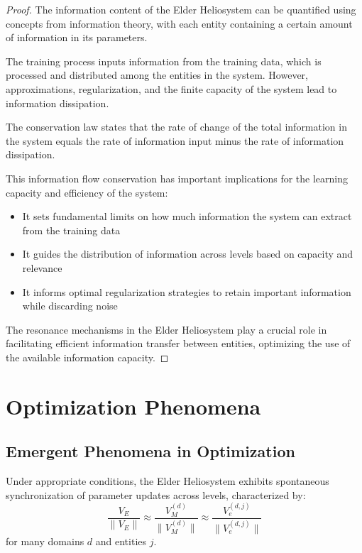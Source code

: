 \begin{proof}
The information content of the Elder Heliosystem can be quantified using concepts from information theory, with each entity containing a certain amount of information in its parameters.

The training process inputs information from the training data, which is processed and distributed among the entities in the system. However, approximations, regularization, and the finite capacity of the system lead to information dissipation.

The conservation law states that the rate of change of the total information in the system equals the rate of information input minus the rate of information dissipation.

This information flow conservation has important implications for the learning capacity and efficiency of the system:
\begin{itemize}
    \item It sets fundamental limits on how much information the system can extract from the training data
    \item It guides the distribution of information across levels based on capacity and relevance
    \item It informs optimal regularization strategies to retain important information while discarding noise
\end{itemize}

The resonance mechanisms in the Elder Heliosystem play a crucial role in facilitating efficient information transfer between entities, optimizing the use of the available information capacity.
\end{proof}

\section{Optimization Phenomena}

\subsection{Emergent Phenomena in Optimization}

\begin{theorem}
Under appropriate conditions, the Elder Heliosystem exhibits spontaneous synchronization of parameter updates across levels, characterized by:
\begin{equation}
\frac{V_E}{\|V_E\|} \approx \frac{V_M^{(d)}}{\|V_M^{(d)}\|} \approx \frac{V_e^{(d,j)}}{\|V_e^{(d,j)}\|}
\end{equation}
for many domains $d$ and entities $j$.
\end{theorem}

